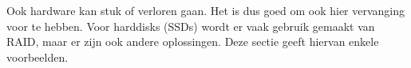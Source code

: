 Ook hardware kan stuk of verloren gaan. Het is dus goed om ook hier vervanging voor te hebben. Voor harddisks (SSDs) wordt er vaak gebruik gemaakt van RAID, maar er zijn ook andere oplossingen. Deze sectie geeft hiervan enkele voorbeelden.

